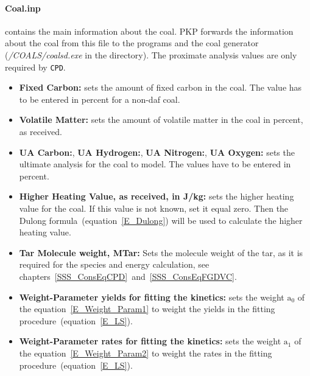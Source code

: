 \paragraph{Coal.inp} contains the main information about the coal. PKP forwards the information about the coal from this file to the programs \CPD and the \FGDVC coal generator (\textit{/COALS/coalsd.exe} in the \FGDVC directory). The proximate analysis values are only required by \texttt{CPD}.
\begin{itemize}
 \item \textbf{Fixed Carbon:} sets the amount of fixed carbon in the coal. The value has to be entered in percent for a non-daf coal.
 \item \textbf{Volatile Matter:} sets the amount of volatile matter in the coal in percent, as received.
 \item \textbf{UA Carbon:}, \textbf{UA Hydrogen:}, \textbf{UA Nitrogen:}, \textbf{UA Oxygen:} sets the ultimate analysis for the coal to model. The values have to be entered in percent.
 \item \textbf{Higher Heating Value, as received, in J/kg:} sets the higher heating value for the coal. If this value is not known, set it equal zero. Then the Dulong formula~(equation~\ref{E_Dulong}) will be used to calculate the higher heating value.
 \item \textbf{Tar Molecule weight, MTar:} Sets the molecule weight of the tar, as it is required for the species and energy calculation, see chapters~\ref{SSS_ConsEqCPD}~and~\ref{SSS_ConsEqFGDVC}.
 \item \textbf{Weight-Parameter yields for fitting the kinetics:} sets the weight $\mathrm{a_0}$ of the equation~\ref{E_Weight_Param1} to weight the yields in the fitting procedure~(equation~\ref{E_LS}).
 \item \textbf{Weight-Parameter rates for fitting the kinetics:}  sets the weight $\mathrm{a_1}$ of the equation~\ref{E_Weight_Param2} to weight the rates in the fitting procedure~(equation~\ref{E_LS}).
\end{itemize}

